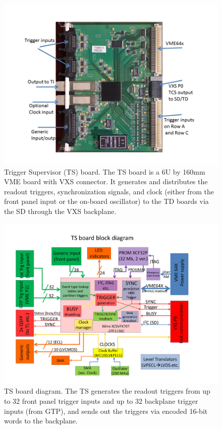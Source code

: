 \begin{figure}[hbt]
	\centering
	\includegraphics[width=1.0\columnwidth,keepaspectratio]{img/TSused.jpg}
	\caption{Trigger Supervisor (TS) board.  The TS board is a 6U by 160mm VME board with VXS connector.  It generates and distributes the readout triggers, synchronization signals, and clock (either from the front panel input or the on-board oscillator) to the TD boards via the SD through the VXS backplane.}
	\label{fig:TSused}
\end{figure}

\begin{figure}[hbt]
	\centering
	\includegraphics[width=1.0\columnwidth,keepaspectratio]{img/TSdiagram.jpg}
	\caption{TS board diagram.  The TS generates the readout triggers from up to 32 front panel trigger inputs and up to 32 backplane trigger inputs (from GTP), and sends out the triggers via encoded 16-bit words to the backplane.}
	\label{fig:TSdiagram}
\end{figure}

